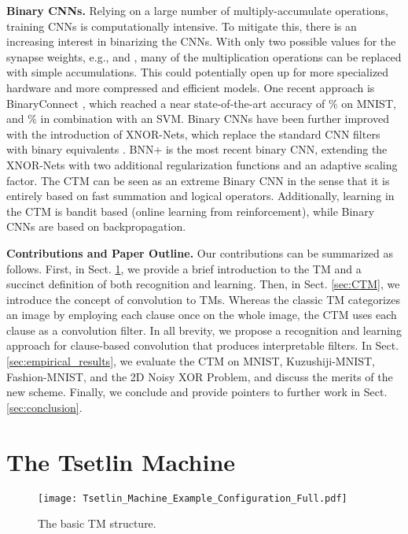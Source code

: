 \documentclass{article}
\begin{document}
\textbf{Binary CNNs.} Relying on a large number of multiply-accumulate operations, training CNNs is computationally intensive. To mitigate this, there is an increasing interest in binarizing the CNNs. With only two possible values for the synapse weights, e.g.,  and , many of the multiplication operations can be replaced with simple accumulations. This could potentially open up for more specialized hardware and more compressed and efficient models. One recent approach is BinaryConnect \cite{courbariaux2015binaryconnect}, which reached a near state-of-the-art accuracy of \% on MNIST, and \% in combination with an SVM. Binary CNNs have been further improved with the introduction of XNOR-Nets, which replace the standard CNN filters with binary equivalents \cite{rastegari2016xnor}. BNN+ \cite{Darabi2018} is the most recent binary CNN, extending the XNOR-Nets with two additional regularization functions and an adaptive scaling factor. The CTM can be seen as an extreme Binary CNN in the sense that it is entirely based on fast summation and logical operators. Additionally, learning in the CTM is bandit based (online learning from reinforcement), while Binary CNNs are based on backpropagation.

\textbf{Contributions and Paper Outline.} Our contributions can be summarized as follows. First, in Sect. \ref{sec:TM}, we provide a brief introduction to the TM and a succinct definition of both recognition and learning. Then, in Sect. \ref{sec:CTM}, we introduce the concept of convolution to TMs. Whereas the classic TM categorizes an image by employing each clause once on the whole image, the CTM uses each clause as a convolution filter. In all brevity, we propose a recognition and learning approach for clause-based convolution that produces interpretable filters. In Sect. \ref{sec:empirical_results}, we evaluate the CTM on MNIST, Kuzushiji-MNIST, Fashion-MNIST, and the 2D Noisy XOR Problem, and discuss the merits of the new scheme. Finally, we conclude and provide pointers to further work in Sect. \ref{sec:conclusion}.

\section{The Tsetlin Machine}
\label{sec:TM}

\begin{figure}[ht]
\centering
\texttt{[image: Tsetlin\_Machine\_Example\_Configuration\_Full.pdf]}
\caption{The basic TM structure.}\label{figure:architecture_basic}
\end{figure}
\end{document}
